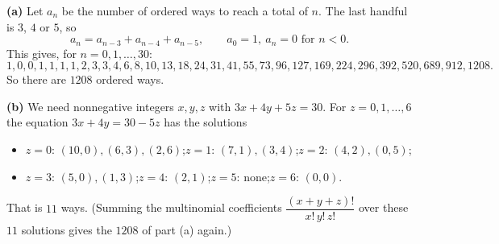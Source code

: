 \textbf{(a)} Let $a_n$ be the number of ordered ways to reach a total of $n$. The last handful is $3$, $4$ or $5$, so
\[a_n=a_{n-3}+a_{n-4}+a_{n-5},\qquad a_0=1,\ a_n=0\text{ for }n<0.\]
This gives, for $n=0,1,\dots,30$:
\[1,0,0,1,1,1,1,2,3,3,4,6,8,10,13,18,24,31,41,55,73,96,127,169,224,296,392,520,689,912,1208.\]
So there are $\boxed{1208}$ ordered ways.

\textbf{(b)} We need nonnegative integers $x,y,z$ with $3x+4y+5z=30$. For $z=0,1,\dots,6$ the equation $3x+4y=30-5z$ has the solutions
\begin{itemize}
\item $z=0$: $(10,0),(6,3),(2,6)$;\quad $z=1$: $(7,1),(3,4)$;\quad $z=2$: $(4,2),(0,5)$;
\item $z=3$: $(5,0),(1,3)$;\quad $z=4$: $(2,1)$;\quad $z=5$: none;\quad $z=6$: $(0,0)$.
\end{itemize}
That is $\boxed{11}$ ways. (Summing the multinomial coefficients $\dfrac{(x+y+z)!}{x!\,y!\,z!}$ over these $11$ solutions gives the $1208$ of part (a) again.)
